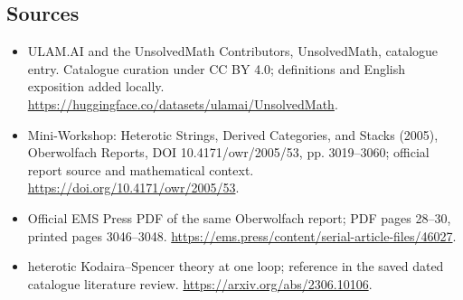 \documentclass[11pt]{article}
\begin{document}
\subsection{Sources}
\begin{itemize}
\item[\hypertarget{source:statement:1}{S1}] ULAM.AI and the UnsolvedMath Contributors, UnsolvedMath, catalogue entry. Catalogue curation under CC BY 4.0; definitions and English exposition added locally.
\url{https://huggingface.co/datasets/ulamai/UnsolvedMath}.
\item[\hypertarget{source:statement:2}{S2}] Mini-Workshop: Heterotic Strings, Derived Categories, and Stacks (2005), Oberwolfach Reports, DOI 10.4171/owr/2005/53, pp. 3019--3060; official report source and mathematical context.
\url{https://doi.org/10.4171/owr/2005/53}.
\item[\hypertarget{source:statement:3}{S3}] Official EMS Press PDF of the same Oberwolfach report; PDF pages 28--30, printed pages 3046--3048.
\url{https://ems.press/content/serial-article-files/46027}.
\item[\hypertarget{source:statement:4}{S4}] heterotic Kodaira--Spencer theory at one loop; reference in the saved dated catalogue literature review.
\url{https://arxiv.org/abs/2306.10106}.
\end{itemize}
\label{end:statement}
\end{document}
